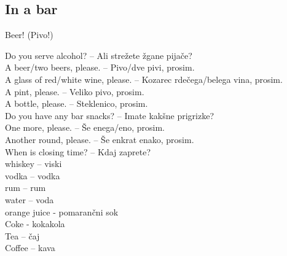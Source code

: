 \subsection{In a bar}

\begin{marginfigure}
\checkoddpage \ifoddpage \forcerectofloat \else \forceversofloat \fi
\centering
 \caption{Beer! (Pivo!) }
 \label{pivo}
\end{marginfigure}

Do you serve alcohol? -- Ali strežete žgane pijače?\\
A beer/two beers, please. -- Pivo/dve pivi, prosim.\\
A glass of red/white wine, please. -- Kozarec rdečega/belega vina, prosim.\\
A pint, please. -- Veliko pivo, prosim.\\
A bottle, please. -- Steklenico, prosim.\\
Do you have any bar snacks? -- Imate kakšne prigrizke?\\
One more, please. -- Še enega/eno, prosim.\\
Another round, please. -- Še enkrat enako, prosim.\\
When is closing time? -- Kdaj zaprete?\\
whiskey -- viski\\
vodka -- vodka\\
rum -- rum\\
water -- voda\\
orange juice - pomarančni sok\\
Coke - kokakola\\
Tea – čaj\\
Coffee – kava\\

